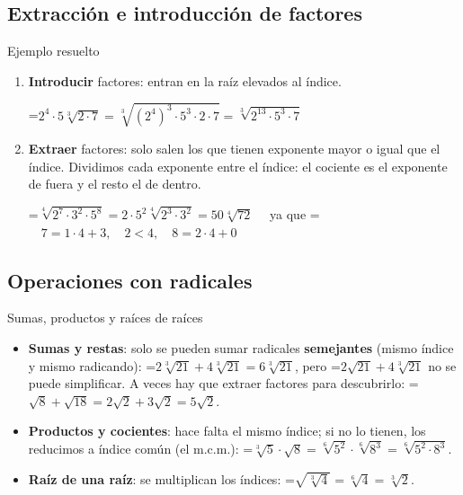 \documentclass[11pt,a4paper]{article}
\newcommand{\lt}{<}\newcommand{\gt}{>}
\newcommand{\fmm}[1]{\setbox0=\hbox{$#1$}\ifdim\wd0>\linewidth\fmdisp{#1}\else\mbox{\box0}\fi}
\newcommand{\fmdisp}[1]{\[\setbox2=\hbox{$\displaystyle #1$}\ifdim\wd2>\linewidth\resizebox{\linewidth}{!}{\box2}\else\box2\fi\]}
\begin{document}
\subsection*{Extracción e introducción de factores}
\begin{fmex}{Ejemplo resuelto}
\begin{enumerate}[label=\textbf{\arabic*.},leftmargin=*]
\item \textbf{Introducir} factores: entran en la raíz elevados al índice.

\fmm{2^4\cdot 5\sqrt[3]{2\cdot 7}=\sqrt[3]{(2^4)^3\cdot 5^3\cdot 2\cdot 7}=\sqrt[3]{2^{13}\cdot 5^3\cdot 7}}
\item \textbf{Extraer} factores: solo salen los que tienen exponente mayor o igual que el índice. Dividimos cada exponente entre el índice: el cociente es el exponente de fuera y el resto el de dentro.

\fmm{\sqrt[4]{2^7\cdot 3^2\cdot 5^8}=2\cdot 5^2\sqrt[4]{2^3\cdot 3^2}=50\sqrt[4]{72}} \,\,\,\,\,\,ya que  \fmm{\quad 7=1\cdot4+3,\quad 2\lt4,\quad 8=2\cdot4+0}
\end{enumerate}
\end{fmex}

\subsection*{Operaciones con radicales}
\begin{fmdef}{Sumas, productos y raíces de raíces}
\begin{itemize}
\item \textbf{Sumas y restas}: solo se pueden sumar radicales \textbf{semejantes} (mismo índice y mismo radicando): \fmm{2\sqrt[3]{21}+4\sqrt[3]{21}=6\sqrt[3]{21}}, pero \fmm{2\sqrt{21}+4\sqrt[3]{21}} no se puede simplificar. A veces hay que extraer factores para descubrirlo: \fmm{\sqrt8+\sqrt{18}=2\sqrt2+3\sqrt2=5\sqrt2}.
\item \textbf{Productos y cocientes}: hace falta el mismo índice; si no lo tienen, los reducimos a índice común (el m.c.m.): \fmm{\sqrt[3]{5}\cdot\sqrt8=\sqrt[6]{5^2}\cdot\sqrt[6]{8^3}=\sqrt[6]{5^2\cdot8^3}}.
\item \textbf{Raíz de una raíz}: se multiplican los índices: \fmm{\sqrt{\sqrt[3]{4}}=\sqrt[6]{4}=\sqrt[3]{2}}.
\end{itemize}
\end{fmdef}

\end{document}
